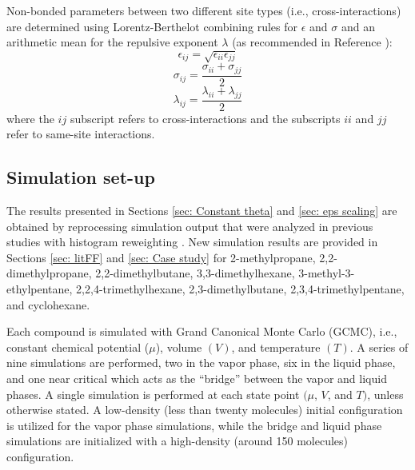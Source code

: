 \documentclass[journal=jced,manuscript=article]{achemso}
\begin{document}
    Non-bonded parameters between two different site types (i.e., cross-interactions) are determined using Lorentz-Berthelot combining rules \cite{Allen1987} for $\epsilon$ and $\sigma$ and an arithmetic mean for the repulsive exponent $\lambda$ (as recommended in Reference ):
    \begin{equation} \label{eq:Lorentz-Berthelot_eps}
    \epsilon_{ij} = \sqrt{\epsilon_{ii} \epsilon_{jj}}
    \end{equation}
    \begin{equation} \label{eq:Lorentz-Berthelot_sig}
    \sigma_{ij} = \frac{\sigma_{ii} + \sigma_{jj}}{2}
    \end{equation}
    \begin{equation} \label{eq:Lorentz-Berthelot_lam}
    \lambda_{ij} = \frac{\lambda_{ii} + \lambda_{jj}}{2}
    \end{equation}
    where the $ij$ subscript refers to cross-interactions and the subscripts $ii$ and $jj$ refer to same-site interactions. 
    

\subsection{Simulation set-up} \label{sec: Simulation set-up}

The results presented in Sections \ref{sec: Constant theta} and \ref{sec: eps scaling} are obtained by reprocessing simulation output that were analyzed in previous studies with histogram reweighting \cite{Potoff_branched,Barhaghi2017}. New simulation results are provided in Sections \ref{sec: litFF} and \ref{sec: Case study} for 2-methylpropane, 2,2-dimethylpropane, 2,2-dimethylbutane, 3,3-dimethylhexane, 3-methyl-3-ethylpentane, 2,2,4-trimethylhexane, 2,3-dimethylbutane, 2,3,4-trimethylpentane, and cyclohexane. 

Each compound is simulated with Grand Canonical Monte Carlo (GCMC), i.e., constant chemical potential ($\mu$), volume $(V)$, and temperature $(T)$. A series of nine simulations are performed, two in the vapor phase, six in the liquid phase, and one near critical which acts as the ``bridge'' between the vapor and liquid phases. A single simulation is performed at each state point $(\mu$, $V$, and $T)$, unless otherwise stated. A low-density (less than twenty molecules) initial configuration is utilized for the vapor phase simulations, while the bridge and liquid phase simulations are initialized with a high-density (around 150 molecules) configuration. 
\end{document}
